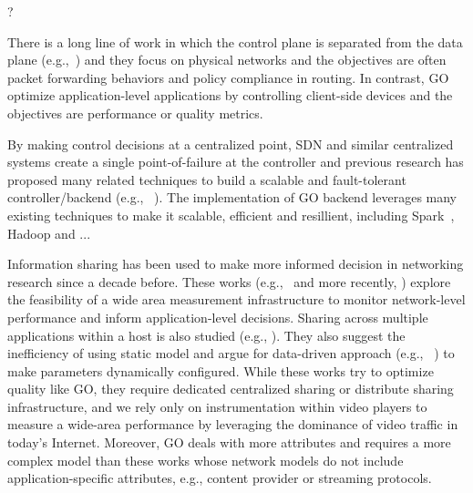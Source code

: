 ?


 There is a long line of work in which the control plane is separated from the data plane (e.g.,~\cite{rcp,onix,yan2007tesseract,openflow}) and they focus on physical networks and the objectives are often packet forwarding behaviors and policy compliance in routing. In contrast, GO optimize application-level applications by controlling client-side devices and the objectives are performance or quality metrics.  

 By making control decisions at a centralized point, SDN and similar centralized systems create a single point-of-failure at the controller and previous research has proposed many related techniques to build a scalable and fault-tolerant controller/backend (e.g., ~\cite{tootoonchian2012controller,yan2007tesseract}). The implementation of GO backend leverages many existing techniques to make it scalable, efficient and resillient, including Spark~\cite{spark}, Hadoop and ...

 Information sharing has been used to make more informed decision in networking research since a decade before. These works (e.g.,~\cite{stemm2000network} and more recently, \cite{choffnes2010crowdsourcing}) explore the feasibility of a wide area measurement infrastructure to monitor network-level performance and inform application-level decisions. Sharing across multiple applications within a host is also studied (e.g., \cite{balakrishnan1999integrated}). They also suggest the inefficiency of using static model and argue for data-driven approach (e.g., ~\cite{Winstein:2013:TEM:2486001.2486020, sivaraman2013no}) to make parameters dynamically configured.
While these works try to optimize quality like GO, they require dedicated centralized sharing or distribute sharing infrastructure, and we rely only on instrumentation within video players to measure a wide-area performance by leveraging the dominance of video traffic in today's Internet. Moreover, GO deals with more attributes and requires a more complex model than these works whose network models do not include application-specific attributes, e.g., content provider or streaming protocols. 
